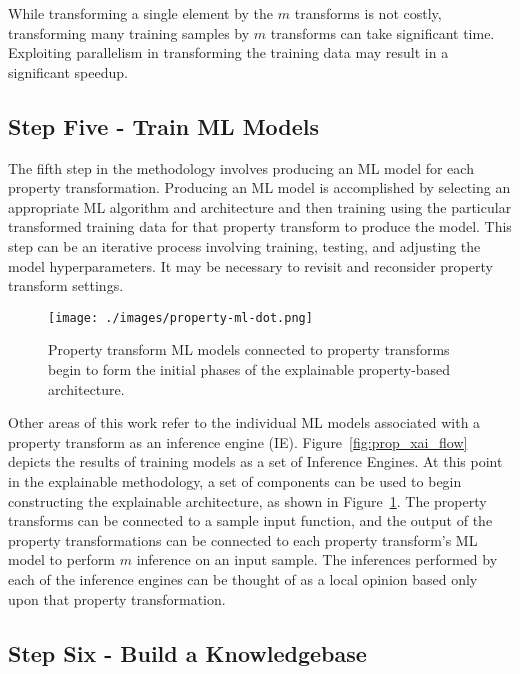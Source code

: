 While transforming a single element by the $m$ transforms is not costly,
transforming many training samples by $m$ transforms can take significant time.
Exploiting parallelism in transforming the training data may result in a
significant speedup.

\subsection{Step Five - Train ML Models} %

The fifth step in the methodology involves producing an ML model for each
property transformation. Producing an ML model is accomplished by selecting an
appropriate ML algorithm and architecture and then training using the particular
transformed training data for that property transform to produce the model. This
step can be an iterative process involving training, testing, and adjusting the
model hyperparameters. It may be necessary to revisit and reconsider property
transform settings.

\begin{figure}[h]
    \centering
    \texttt{[image: ./images/property-ml-dot.png]}
    \caption{Property transform ML models connected to property transforms begin to form the initial phases of the explainable property-based architecture.}
    \label{fig:property_ml}
\end{figure}

Other areas of this work refer to the individual ML models associated with a
property transform as an inference engine (IE). Figure~\ref{fig:prop_xai_flow}
depicts the results of training models as a set of Inference Engines. At this
point in the explainable methodology, a set of components can be used to begin
constructing the explainable architecture, as shown in
Figure~\ref{fig:property_ml}. The property transforms can be connected to a
sample input function, and the output of the property transformations can be
connected to each property transform's ML model to perform $m$ inference on an
input sample. The inferences performed by each of the inference engines can be
thought of as a local opinion based only upon that property transformation.

\subsection{Step Six - Build a Knowledgebase} %

